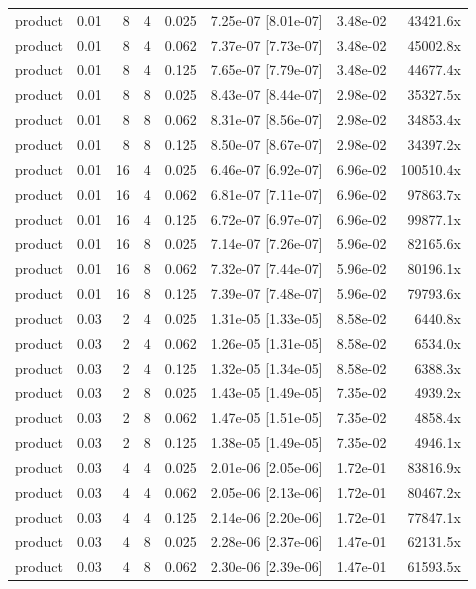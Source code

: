\begin{tabular}{lrrrrrrr}
product & 0.01 & 8 & 4 & 0.025 & 7.25e-07 [8.01e-07] & 3.48e-02 & 43421.6x \\
product & 0.01 & 8 & 4 & 0.062 & 7.37e-07 [7.73e-07] & 3.48e-02 & 45002.8x \\
product & 0.01 & 8 & 4 & 0.125 & 7.65e-07 [7.79e-07] & 3.48e-02 & 44677.4x \\
product & 0.01 & 8 & 8 & 0.025 & 8.43e-07 [8.44e-07] & 2.98e-02 & 35327.5x \\
product & 0.01 & 8 & 8 & 0.062 & 8.31e-07 [8.56e-07] & 2.98e-02 & 34853.4x \\
product & 0.01 & 8 & 8 & 0.125 & 8.50e-07 [8.67e-07] & 2.98e-02 & 34397.2x \\
product & 0.01 & 16 & 4 & 0.025 & 6.46e-07 [6.92e-07] & 6.96e-02 & 100510.4x \\
product & 0.01 & 16 & 4 & 0.062 & 6.81e-07 [7.11e-07] & 6.96e-02 & 97863.7x \\
product & 0.01 & 16 & 4 & 0.125 & 6.72e-07 [6.97e-07] & 6.96e-02 & 99877.1x \\
product & 0.01 & 16 & 8 & 0.025 & 7.14e-07 [7.26e-07] & 5.96e-02 & 82165.6x \\
product & 0.01 & 16 & 8 & 0.062 & 7.32e-07 [7.44e-07] & 5.96e-02 & 80196.1x \\
product & 0.01 & 16 & 8 & 0.125 & 7.39e-07 [7.48e-07] & 5.96e-02 & 79793.6x \\
product & 0.03 & 2 & 4 & 0.025 & 1.31e-05 [1.33e-05] & 8.58e-02 & 6440.8x \\
product & 0.03 & 2 & 4 & 0.062 & 1.26e-05 [1.31e-05] & 8.58e-02 & 6534.0x \\
product & 0.03 & 2 & 4 & 0.125 & 1.32e-05 [1.34e-05] & 8.58e-02 & 6388.3x \\
product & 0.03 & 2 & 8 & 0.025 & 1.43e-05 [1.49e-05] & 7.35e-02 & 4939.2x \\
product & 0.03 & 2 & 8 & 0.062 & 1.47e-05 [1.51e-05] & 7.35e-02 & 4858.4x \\
product & 0.03 & 2 & 8 & 0.125 & 1.38e-05 [1.49e-05] & 7.35e-02 & 4946.1x \\
product & 0.03 & 4 & 4 & 0.025 & 2.01e-06 [2.05e-06] & 1.72e-01 & 83816.9x \\
product & 0.03 & 4 & 4 & 0.062 & 2.05e-06 [2.13e-06] & 1.72e-01 & 80467.2x \\
product & 0.03 & 4 & 4 & 0.125 & 2.14e-06 [2.20e-06] & 1.72e-01 & 77847.1x \\
product & 0.03 & 4 & 8 & 0.025 & 2.28e-06 [2.37e-06] & 1.47e-01 & 62131.5x \\
product & 0.03 & 4 & 8 & 0.062 & 2.30e-06 [2.39e-06] & 1.47e-01 & 61593.5x \\

\end{tabular}
